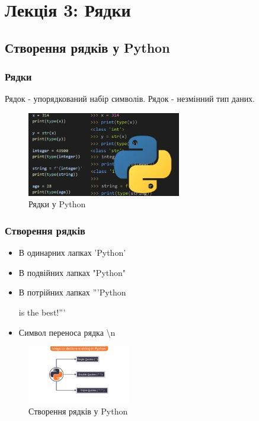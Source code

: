 \section*{Лекція 3: Рядки}
\subsection{Створення рядків у Python} 
\begin{frame}
\frametitle{Рядки}
Рядок - упорядкований набір символів. Рядок - незмінний тип даних.
\begin{figure}
\begin{center}
 \includegraphics[width=0.6\textwidth]{pictures/strings.png}
\caption{Рядки у Python}
\label{python_site} 
\end{center}
\end{figure}
\end{frame}

\begin{frame}
\frametitle{Створення рядків}
\begin{itemize}
  \item В одинарних лапках 'Python'
  \item В подвійних лапках "Python"
  \item 
  В потрійних лапках '''Python
  
  is the best!'''
  \item Символ переноса рядка \textbackslash n
 \end{itemize}
\begin{figure}
\begin{center}
 \includegraphics[width=0.4\textwidth]{pictures/declare_string.png}
\caption{Створення рядків у Python}
\label{python_site} 
\end{center}
\end{figure}
\end{frame}

